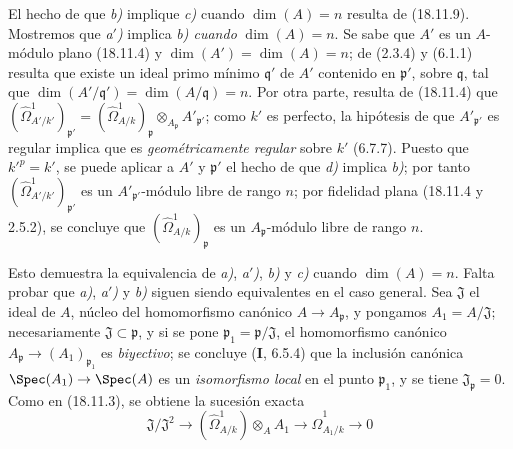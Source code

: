 El hecho de que \emph{b)} implique \emph{c)} cuando $\dim(A)=n$ resulta de (18.11.9). Mostremos que \emph{a$'$)} implica \emph{b) cuando} $\dim(A)=n$. Se sabe que $A'$ es un $A$-módulo plano (18.11.4) y $\dim(A')=\dim(A)=n$; de (2.3.4) y (6.1.1) resulta que existe un ideal primo mínimo $\mathfrak q'$ de $A'$ contenido en $\mathfrak p'$, sobre $\mathfrak q$, tal que $\dim(A'/\mathfrak q')=\dim(A/\mathfrak q)=n$. Por otra parte, resulta de (18.11.4) que
$(\hat{\Omega}^1_{A'/k'})_{\mathfrak p'}=(\hat{\Omega}^1_{A/k})_{\mathfrak p}\otimes_{A_{\mathfrak p}}A'_{\mathfrak p'}$;
como $k'$ es perfecto, la hipótesis de que $A'_{\mathfrak p'}$ es regular implica que es \emph{geométricamente regular} sobre $k'$ (6.7.7). Puesto que $k'^p=k'$, se puede aplicar a $A'$ y $\mathfrak p'$ el hecho de que \emph{d)} implica \emph{b)}; por tanto $(\hat{\Omega}^1_{A'/k'})_{\mathfrak p'}$ es un $A'_{\mathfrak p'}$-módulo libre de rango $n$; por fidelidad plana (18.11.4 y 2.5.2), se concluye que $(\hat{\Omega}^1_{A/k})_{\mathfrak p}$ es un $A_{\mathfrak p}$-módulo libre de rango $n$.

Esto demuestra la equivalencia de \emph{a)}, \emph{a$'$)}, \emph{b)} y \emph{c)} cuando $\dim(A)=n$. Falta probar que \emph{a)}, \emph{a$'$)} y \emph{b)} siguen siendo equivalentes en el caso general. Sea $\mathfrak J$ el ideal de $A$, núcleo del homomorfismo canónico $A\to A_{\mathfrak p}$, y pongamos $A_1=A/\mathfrak J$; necesariamente $\mathfrak J\subset\mathfrak p$, y si se pone $\mathfrak p_1=\mathfrak p/\mathfrak J$, el homomorfismo canónico $A_{\mathfrak p}\to(A_1)_{\mathfrak p_1}$ es \emph{biyectivo}; se concluye (\textbf I, 6.5.4) que la inclusión canónica $\Spec(A_1)\to\Spec(A)$ es un \emph{isomorfismo local} en el punto $\mathfrak p_1$, y se tiene $\mathfrak J_{\mathfrak p}=0$. Como en (18.11.3), se obtiene la sucesión exacta
\[
  \mathfrak J/\mathfrak J^2\longrightarrow(\hat{\Omega}^1_{A/k})\otimes_A A_1\longrightarrow\hat{\Omega}^1_{A_1/k}\longrightarrow0
\]

